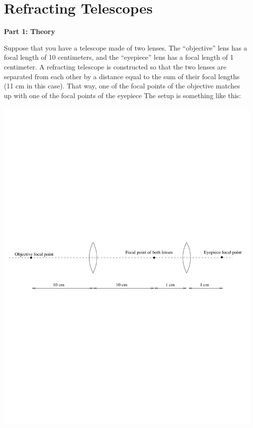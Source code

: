 \section{Refracting Telescopes}

\makelabheader

{\bf Part 1: Theory}

Suppose that you have a telescope made of two lenses.  The ``objective''
lens has a focal length of 10 centimeters, and the ``eyepiece'' lens
has a focal length of 1 centimeter.  A refracting telescope is constructed
so that the two lenses are separated from each other by a distance
equal to the sum of their focal lengths (11 cm in this case).  That
way, one of the focal points of the objective matches up with one
of the focal points of the eyepiece
The setup is something like this:

\medskip

\centerline{\includegraphics[width=\textwidth]{telescope/telescopefig1.pdf}}

